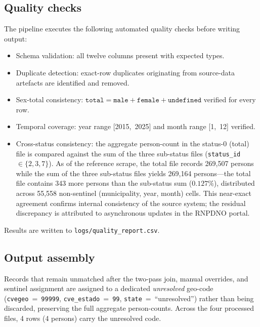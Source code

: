\documentclass[3p]{elsarticle}
\begin{document}
\subsection*{Quality checks}

The pipeline executes the following automated quality checks
before writing output:

\begin{itemize}
  \item Schema validation: all twelve columns present with
    expected types.
  \item Duplicate detection: exact-row duplicates originating
    from source-data artefacts are identified and removed.
  \item Sex-total consistency:
    $\texttt{total} = \texttt{male} + \texttt{female}
    + \texttt{undefined}$ verified for every row.
  \item Temporal coverage: year range [2015,~2025] and month
    range [1,~12] verified.
  \item Cross-status consistency: the aggregate person-count
    in the status-0 (total) file is compared against the sum
    of the three sub-status files
    (\texttt{status\_id}~$\in\{2,3,7\}$).
    As of the reference scrape, the total file records
    269{,}507 persons while the sum of the three sub-status
    files yields 269{,}164 persons---the total file contains
    343 more persons than the sub-status sum ($0.127\%$),
    distributed across 55{,}558
    non-sentinel (municipality, year, month) cells.
    This near-exact agreement confirms internal consistency
    of the source system; the residual discrepancy is
    attributed to asynchronous updates in the RNPDNO portal.
\end{itemize}

Results are written to \texttt{logs/quality\_report.csv}.


\subsection*{Output assembly}                                                                                                                                                               
                                                            
  Records that remain unmatched after the two-pass join, manual
  overrides, and sentinel assignment are assigned to a dedicated
  \emph{unresolved} geo-code (\texttt{cvegeo}~=~\texttt{99999},
  \texttt{cve\_estado}~=~\texttt{99}, \texttt{state}~=~``unresolved'')                                                                                                                        
  rather than being discarded, preserving the full aggregate
  person-counts.                                                                                                                                                                              
  Across the four processed files, 4 rows (4 persons) carry 
  the unresolved code.                                                                                                                                                                        
                                                            
\end{document}
